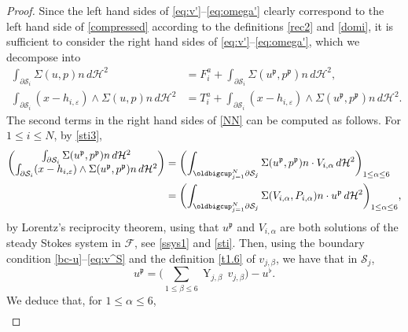 \documentclass[JEP,XML,SOM,Unicode, NoEqCountersInSection,NoFloatCountersInSection,published]{cedram}
\let\eps\varepsilon
\DeclareMathOperator{\Y}{Y}
\theoremstyle{definition}
\theoremstyle{remark}
\begin{document}
\begin{proof}
Since the left hand sides of \eqref{eq:v'}--\eqref{eq:omega'} clearly correspond to
the left hand side of \eqref{compressed} according to the definitions \eqref{rec2} and \eqref{domi}, it is sufficient to
consider the right hand sides of \eqref{eq:v'}--\eqref{eq:omega'}, which we decompose into
\begin{subequations}
\label{NN}
\begin{align}
\int_{\partial \mathcal S_i } \Sigma(u,p) n \, d\mathcal{H}^2
&= F_i^a +\int_{\partial \mathcal S_i } \Sigma (u^\mathfrak{p}, p^\mathfrak{p}) n \, d\mathcal{H}^2, \\
\int_{\partial \mathcal S_i} (x - h_{i,\eps}) \wedge \Sigma(u,p) n \, d\mathcal{H}^2
&= T_i^a +
\int_{\partial \mathcal S_i} (x - h_{i,\eps}) \wedge \Sigma (u^\mathfrak{p}, p^\mathfrak{p}) n \, d\mathcal{H}^2.
\end{align}
\end{subequations}
The second terms in the right hand sides of \eqref{NN} can be computed as follows.
For $1 \leq i \leq N$, by \eqref{sti3},
\begin{align*}
\begin{pmatrix}
\int_{\partial \mathcal S_i } \Sigma(u^\mathfrak{p}, p^\mathfrak{p}) n \, d\mathcal{H}^2 \\
\int_{\partial \mathcal S_i} (x - h_{i,\eps}) \wedge \Sigma(u^\mathfrak{p}, p^\mathfrak{p}) n \, d\mathcal{H}^2
\end{pmatrix}
&=
\biggl(
\int_{\oldbigcup_{j=1}^N \partial \mathcal S_j }
\Sigma(u^\mathfrak{p}, p^\mathfrak{p}) n \cdot V_{i,\alpha} \, d\mathcal{H}^2
\biggr)_{1 \leq \alpha \leq 6}
\\ &=
\biggl(
\int_{\oldbigcup_{j=1}^N \partial \mathcal S_j } \Sigma(V_{i,\alpha}, P_{i,\alpha}) n \cdot u^\mathfrak{p} \, d\mathcal{H}^2
\biggr)_{1 \leq \alpha \leq 6},
\end{align*}
by Lorentz's reciprocity theorem, using that $u^\mathfrak{p}$ and $V_{i,\alpha}$ are both solutions of the steady Stokes system in $ \mathcal F$, see \eqref{ssys1} and \eqref{sti}.
Then, using the boundary condition \eqref{bc-u}--\eqref{eq:v^S} and the definition \eqref{t1.6} of $v_{j,\beta}$, we have that in $ \mathcal{S}_j$,
\begin{equation} \label{rec1}
u^\mathfrak{p} = \biggl(\sum_{1\leq \beta \leq 6} \Y_{j,\beta }\, v_{j,\beta}\biggr) - u^\flat.
\end{equation}
We deduce that, for $1 \leq \alpha \leq 6$,
\begin{multline*}

\end{multline*}
\end{proof}
\end{document}

